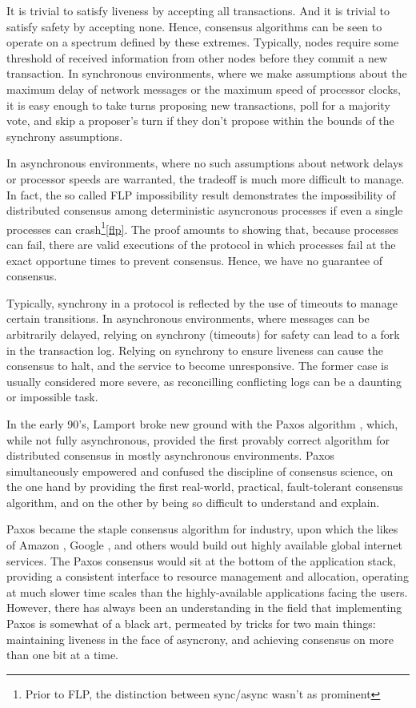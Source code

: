 It is trivial to satisfy liveness by accepting all transactions. And it is trivial to satisfy safety by accepting none.
Hence, consensus algorithms can be seen to operate on a spectrum defined by these extremes.
Typically, nodes require some threshold of received information from other nodes before they commit a new transaction.
In synchronous environments, 
where we make assumptions about the maximum delay of network messages or the maximum speed of processor clocks,
 it is easy enough to take turns proposing new transactions, poll for a majority vote, 
and skip a proposer's turn if they don't propose within the bounds of the synchrony assumptions.

In asynchronous environments, where no such assumptions about network delays or processor speeds are warranted,
the tradeoff is much more difficult to manage.
In fact, the so called FLP impossibility result demonstrates the 
impossibility of distributed consensus among deterministic asyncronous processes 
if even a single processes can crash\footnote{Prior to FLP, the distinction between sync/async wasn't as prominent}\ref{flp}.
The proof amounts to showing that, because processes can fail, 
there are valid executions of the protocol in which processes fail at the exact opportune times to prevent consensus.
Hence, we have no guarantee of consensus.

Typically, synchrony in a protocol is reflected by the use of timeouts to manage certain transitions.
In asynchronous environments, where messages can be arbitrarily delayed, relying on synchrony (timeouts) for safety
can lead to a fork in the transaction log.
Relying on synchrony to ensure liveness can cause the consensus to halt, and the service to become unresponsive.
The former case is usually considered more severe, as reconcilling conflicting logs can be a daunting or impossible task. 

In the early 90's, Lamport broke new ground with the Paxos algorithm \cite{paxos},
which, while not fully asynchronous,
provided the first provably correct algorithm for distributed consensus in mostly asynchronous environments.
Paxos simultaneously empowered and confused the discipline of consensus science,
on the one hand by providing the first real-world, practical, fault-tolerant consensus algorithm,
and on the other by being so difficult to understand and explain.

Paxos became the staple consensus algorithm for industry, 
upon which the likes of Amazon \cite{dynamo}, Google \cite{chubby}, 
and others would build out highly available global internet services.
The Paxos consensus would sit at the bottom of the application stack, 
providing a consistent interface to resource management and allocation, 
operating at much slower time scales than the highly-available applications facing the users.
However, there has always been an understanding in the field that implementing Paxos is somewhat of a black art,
permeated by tricks for two main things: 
maintaining liveness in the face of asyncrony, and achieving consensus on more than one bit at a time.

